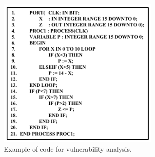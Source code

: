 \documentclass[10pt,journal, compsoc]{IEEEtran}
\begin{document}
\begin{figure}[!t]
\centering
\hspace*{-0.8em}
\includegraphics[width=8cm]{figure/sample_code.pdf}
\caption{Example of code for vulnerability analysis.}
\label{fig:sample_code}
\end{figure}
\end{document}
